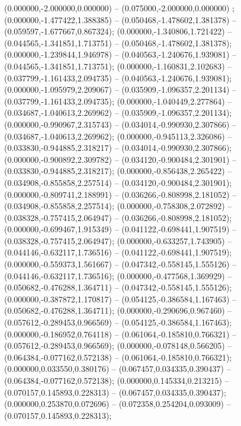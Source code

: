  (0.000000,-2.000000,0.000000) -- (0.075000,-2.000000,0.000000) ;
 (0.000000,-1.477422,1.388385) -- (0.050468,-1.478602,1.381378) -- (0.059597,-1.677667,0.867324);
 (0.000000,-1.340806,1.721422) -- (0.044565,-1.341851,1.713751) -- (0.050468,-1.478602,1.381378);
 (0.000000,-1.239844,1.946978) -- (0.040563,-1.240676,1.939081) -- (0.044565,-1.341851,1.713751);
 (0.000000,-1.160831,2.102683) -- (0.037799,-1.161433,2.094735) -- (0.040563,-1.240676,1.939081);
 (0.000000,-1.095979,2.209067) -- (0.035909,-1.096357,2.201134) -- (0.037799,-1.161433,2.094735);
 (0.000000,-1.040449,2.277864) -- (0.034687,-1.040613,2.269962) -- (0.035909,-1.096357,2.201134);
 (0.000000,-0.990967,2.315743) -- (0.034014,-0.990930,2.307866) -- (0.034687,-1.040613,2.269962);
 (0.000000,-0.945113,2.326086) -- (0.033830,-0.944885,2.318217) -- (0.034014,-0.990930,2.307866);
 (0.000000,-0.900892,2.309782) -- (0.034120,-0.900484,2.301901) -- (0.033830,-0.944885,2.318217);
 (0.000000,-0.856438,2.265422) -- (0.034908,-0.855858,2.257514) -- (0.034120,-0.900484,2.301901);
 (0.000000,-0.809741,2.188991) -- (0.036266,-0.808998,2.181052) -- (0.034908,-0.855858,2.257514);
 (0.000000,-0.758308,2.072892) -- (0.038328,-0.757415,2.064947) -- (0.036266,-0.808998,2.181052);
 (0.000000,-0.699467,1.915349) -- (0.041122,-0.698441,1.907519) -- (0.038328,-0.757415,2.064947);
 (0.000000,-0.633257,1.743905) -- (0.044146,-0.632117,1.736516) -- (0.041122,-0.698441,1.907519);
 (0.000000,-0.559373,1.561667) -- (0.047342,-0.558145,1.555126) -- (0.044146,-0.632117,1.736516);
 (0.000000,-0.477568,1.369929) -- (0.050682,-0.476288,1.364711) -- (0.047342,-0.558145,1.555126);
 (0.000000,-0.387872,1.170817) -- (0.054125,-0.386584,1.167463) -- (0.050682,-0.476288,1.364711);
 (0.000000,-0.290696,0.967460) -- (0.057612,-0.289453,0.966569) -- (0.054125,-0.386584,1.167463);
 (0.000000,-0.186952,0.764118) -- (0.061064,-0.185810,0.766321) -- (0.057612,-0.289453,0.966569);
 (0.000000,-0.078148,0.566205) -- (0.064384,-0.077162,0.572138) -- (0.061064,-0.185810,0.766321);
 (0.000000,0.033550,0.380176) -- (0.067457,0.034335,0.390437) -- (0.064384,-0.077162,0.572138);
 (0.000000,0.145334,0.213215) -- (0.070157,0.145893,0.228313) -- (0.067457,0.034335,0.390437);
 (0.000000,0.253870,0.072696) -- (0.072358,0.254204,0.093009) -- (0.070157,0.145893,0.228313);
